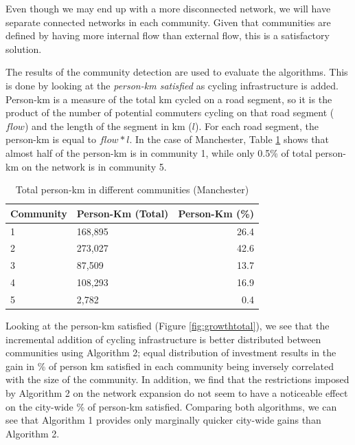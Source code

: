 \documentclass[
]{article}
\begin{document}
Even though we may end up with a more disconnected network, we will have
separate connected networks in each community. Given that communities
are defined by having more internal flow than external flow, this is a
satisfactory solution.

The results of the community detection are used to evaluate the
algorithms. This is done by looking at the \emph{person-km satisfied} as
cycling infrastructure is added. Person-km is a measure of the total km
cycled on a road segment, so it is the product of the number of
potential commuters cycling on that road segment (\(flow\)) and the length
of the segment in km (\(l\)). For each road segment, the person-km is
equal to \(flow * l\). In the case of Manchester, Table
\ref{tab:personkmtable} shows that almost half of the person-km is in
community 1, while only 0.5\% of total person-km on the network is in
community 5.

\begin{table}[!h]

\caption{\label{tab:personkmtable}Total person-km in different communities (Manchester)}
\centering
\begin{tabular}[t]{l|l|r}
\hline
Community & Person-Km (Total) & Person-Km (\%)\\
\hline
1 & 168,895 & 26.4\\
\hline
2 & 273,027 & 42.6\\
\hline
3 & 87,509 & 13.7\\
\hline
4 & 108,293 & 16.9\\
\hline
5 & 2,782 & 0.4\\
\hline
\end{tabular}
\end{table}

Looking at the person-km satisfied (Figure \ref{fig:growthtotal}), we
see that the incremental addition of cycling infrastructure is better
distributed between communities using Algorithm 2; equal distribution of
investment results in the gain in \% of person km satisfied in each
community being inversely correlated with the size of the community. In
addition, we find that the restrictions imposed by Algorithm 2 on the
network expansion do not seem to have a noticeable effect on the
city-wide \% of person-km satisfied. Comparing both algorithms, we can
see that Algorithm 1 provides only marginally quicker city-wide gains
than Algorithm 2.
\end{document}
